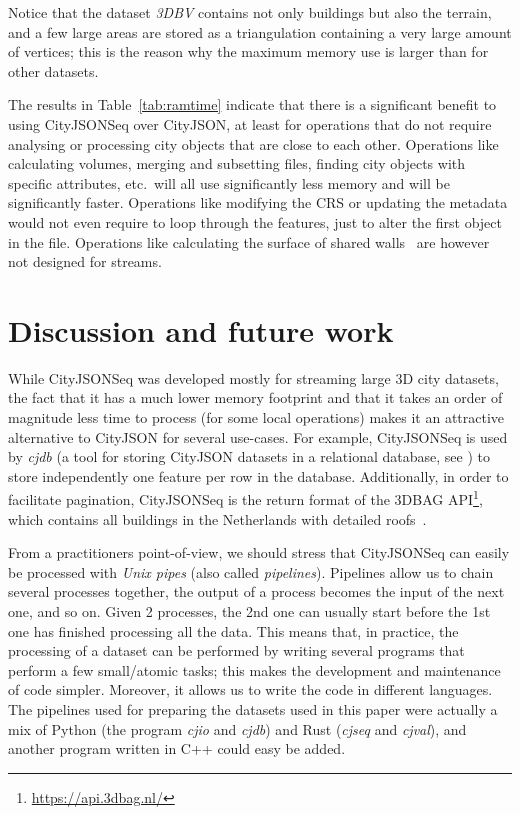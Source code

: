 \documentclass{isprs} %
\begin{document}
Notice that the dataset \emph{3DBV} contains not only buildings but also the terrain, and a few large areas are stored as a triangulation containing a very large amount of vertices; this is the reason why the maximum memory use is larger than for other datasets. 

%

The results in Table~\ref{tab:ramtime} indicate that there is a significant benefit to using CityJSONSeq over CityJSON, at least for operations that do not require analysing or processing city objects that are close to each other.
Operations like calculating volumes, merging and subsetting files, finding city objects with specific attributes, etc.\ will all use significantly less memory and will be significantly faster.
Operations like modifying the CRS or updating the metadata would not even require to loop through the features, just to alter the first object in the file.
Operations like calculating the surface of shared walls~\citep{Agugiaro22} are however not designed for streams.


%
\section{Discussion and future work}%
\label{sec:discussion}



While CityJSONSeq was developed mostly for streaming large 3D city datasets, the fact that it has a much lower memory footprint and that it takes an order of magnitude less time to process (for some local operations) makes it an attractive alternative to CityJSON for several use-cases.
For example, CityJSONSeq is used by \emph{cjdb} (a tool for storing CityJSON datasets in a relational database, see \citet{Powalka23}) to store independently one feature per row in the database.
Additionally, in order to facilitate pagination, CityJSONSeq is the return format of the 3DBAG API\footnote{\url{https://api.3dbag.nl/}}, which contains all buildings in the Netherlands with detailed roofs~\citep{Peters22}. 

%

From a practitioners point-of-view, we should stress that CityJSONSeq can easily be processed with \emph{Unix pipes} (also called \emph{pipelines}).
Pipelines allow us to chain several processes together, the output of a process becomes the input of the next one, and so on. 
Given 2 processes, the 2nd one can usually start before the 1st one has finished processing all the data.
This means that, in practice, the processing of a dataset can be performed by writing several programs that perform a few small/atomic tasks; this makes the development and maintenance of code simpler.
Moreover, it allows us to write the code in different languages. 
The pipelines used for preparing the datasets used in this paper were actually a mix of Python (the program \emph{cjio} and \emph{cjdb}) and Rust (\emph{cjseq} and \emph{cjval}), and another program written in C++ could easy be added.
\end{document}
